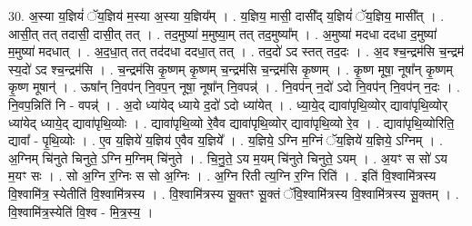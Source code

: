 \documentclass[17pt]{extarticle}
\begin{document}
30. अ॒स्या य॒ज्ञियं॑ ॅय॒ज्ञिय॑ म॒स्या अ॒स्या य॒ज्ञिय᳚म् । . य॒ज्ञिय॒ मासी॒ दासी᳚द् य॒ज्ञियं॑ ॅय॒ज्ञिय॒ मासी᳚त् । . आसी॒त् तत् तदासी॒ दासी॒त् तत् । . तद॒मुष्या॑ म॒मुष्या॒म् तत् तद॒मुष्या᳚म् । . अ॒मुष्या॑ मदधा ददधा द॒मुष्या॑ म॒मुष्या॑ मदधात् । . अ॒द॒धा॒त् तत् तद॑दधा ददधा॒त् तत् । . तद॒दो॑ ऽद स्तत् तद॒दः । . अ॒द श्च॒न्द्रम॑सि च॒न्द्रम॑ स्य॒दो॑ ऽद श्च॒न्द्रम॑सि । . च॒न्द्रम॑सि कृ॒ष्णम् कृ॒ष्णम् च॒न्द्रम॑सि च॒न्द्रम॑सि कृ॒ष्णम् । . कृ॒ष्ण मूषा॒ नूषा᳚न् कृ॒ष्णम् कृ॒ष्ण मूषान्॑ । . ऊषा᳚न् नि॒वप॑न् नि॒वप॒न् नूषा॒ नूषा᳚न् नि॒वपन्न्॑ । . नि॒वप॑न् न॒दो॑ ऽदो नि॒वप॑न् नि॒वप॑न् न॒दः । . नि॒वप॒न्निति॑ नि - वपन्न्॑ । . अ॒दो ध्या॑येद् ध्याये द॒दो॑ ऽदो ध्या॑येत् । . ध्या॒ये॒द् द्यावा॑पृथि॒व्योर् द्यावा॑पृथि॒व्योर् ध्या॑येद् ध्याये॒द् द्यावा॑पृथि॒व्योः । . द्यावा॑पृथि॒व्यो रे॒वैव द्यावा॑पृथि॒व्योर् द्यावा॑पृथि॒व्यो रे॒व । . द्यावा॑पृथि॒व्योरिति॒ द्यावा᳚ - पृ॒थि॒व्योः । . ए॒व य॒ज्ञिये॑ य॒ज्ञिय॑ ए॒वैव य॒ज्ञिये᳚ । . य॒ज्ञिये॒ ऽग्नि म॒ग्निं ॅय॒ज्ञिये॑ य॒ज्ञिये॒ ऽग्निम् । . अ॒ग्निम् चि॑नुते चिनुते॒ ऽग्नि म॒ग्निम् चि॑नुते । . चि॒नु॒ते॒ ऽय म॒यम् चि॑नुते चिनुते॒ ऽयम् । . अ॒यꣳ स सो॑ ऽय म॒यꣳ सः । . सो अ॒ग्नि र॒ग्निः स सो अ॒ग्निः । . अ॒ग्नि रिती त्य॒ग्नि र॒ग्नि रिति॑ । . इति॑ वि॒श्वामि॑त्रस्य वि॒श्वामि॑त्र॒ स्येतीति॑ वि॒श्वामि॑त्रस्य । . वि॒श्वामि॑त्रस्य सू॒क्तꣳ सू॒क्तं ॅवि॒श्वामि॑त्रस्य वि॒श्वामि॑त्रस्य सू॒क्तम् । . वि॒श्वामि॑त्र॒स्येति॑ वि॒श्व - मि॒त्र॒स्य॒ । \newline
\end{document}
